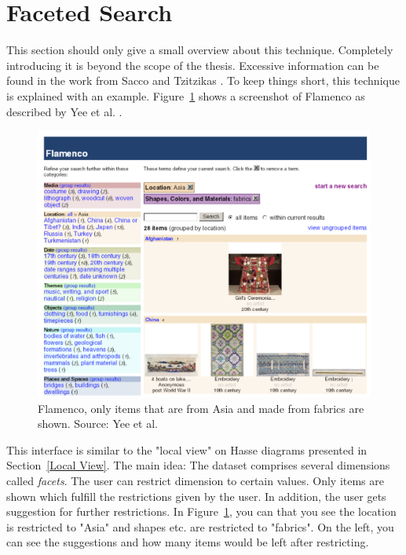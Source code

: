 \documentclass[11pt]{report}
\begin{document}
\section{Faceted Search}
\label{dyafs}

This section should only give a small overview about this technique. Completely introducing it is beyond the scope of the thesis. Excessive information can be found in the work from Sacco and Tzitzikas \cite{Sacco2009}. To keep things short, this technique is explained with an example. Figure~\ref{figure:flamenco} shows a screenshot of Flamenco as described by Yee et al. \cite{Yee2003}. \\

\begin{figure}[!ht]
	\centering
	\includegraphics[width=\linewidth]{images/flamenco}
\caption{Flamenco, only items that are from Asia and made from fabrics are shown. Source: Yee et al. \cite{Yee2003}}
\label{figure:flamenco}
\end{figure}

This interface is similar to the "local view" on Hasse diagrams presented in Section~\ref{Local View}. The main idea: The dataset comprises several dimensions called \textit{facets}. The user can restrict dimension to certain values. Only items are shown which fulfill the restrictions given by the user. In addition, the user gets suggestion for further restrictions. In Figure~\ref{figure:flamenco}, you can that you see the location is restricted to "Asia" and shapes etc. are restricted to "fabrics". On the left, you can see the suggestions and how many items would be left after restricting. \\
\end{document}
